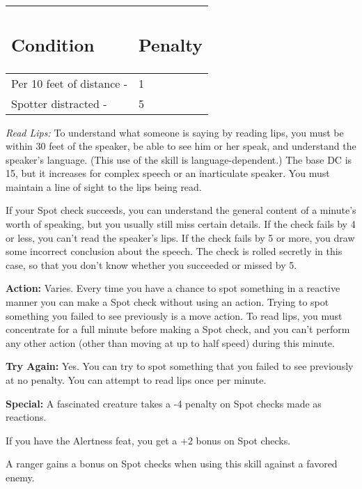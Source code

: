 \documentclass{article}
\begin{document}
\vspace{12pt}
\begin{tabular}{|>{\raggedright}p{88pt}|>{\raggedright}p{31pt}|}
\hline
\subsection*{C\textbf{ondition }} & \subsection*{P\textbf{enalty}}\tabularnewline
\hline
Per 10 feet of distance - & 1\tabularnewline
\hline
Spotter distracted - & 5\tabularnewline
\hline
\end{tabular}

\vspace{12pt}
\textit{Read Lips: }To understand what someone is saying by reading lips, you must 
be within 30 feet of the speaker, be able to see him or her speak, and understand 
the speaker's language. (This use of the skill is language-dependent.) The base 
DC is 15, but it increases for complex speech or an inarticulate speaker. You must 
maintain a line of sight to the lips being read.

If your Spot check succeeds, you can understand the general content of a minute's 
worth of speaking, but you usually still miss certain details. If the check fails 
by 4 or less, you can't read the speaker's lips. If the check fails by 5 or more, 
you draw some incorrect conclusion about the speech. The check is rolled secretly 
in this case, so that you don't know whether you succeeded or missed by 5.

\textbf{Action: }Varies. Every time you have a chance to spot something in a reactive 
manner you can make a Spot check without using an action. Trying to spot something 
you failed to see previously is a move action. To read lips, you must concentrate 
for a full minute before making a Spot check, and you can't perform any other action 
(other than moving at up to half speed) during this minute.

\textbf{Try Again:} Yes. You can try to spot something that you failed to see previously 
at no penalty. You can attempt to read lips once per minute.

\textbf{Special:} A fascinated creature takes a -4 penalty on Spot checks made 
as reactions.

If you have the Alertness feat, you get a +2 bonus on Spot checks.

A ranger gains a bonus on Spot checks when using this skill against a favored enemy.
\end{document}
